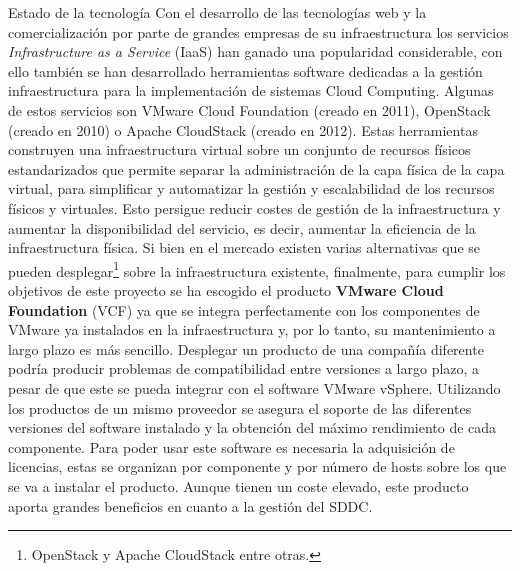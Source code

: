 \begin{section}{Estado de la tecnología}
Con el desarrollo de las tecnologías web y la comercialización por parte de grandes empresas de su infraestructura los servicios \textit{Infrastructure as a Service} (IaaS) han ganado una popularidad considerable, con ello también se han desarrollado herramientas software dedicadas a la gestión infraestructura para la implementación de sistemas Cloud Computing. Algunas de estos servicios son VMware Cloud Foundation (creado en 2011), OpenStack (creado en 2010) o Apache CloudStack (creado en 2012). Estas herramientas construyen una infraestructura virtual sobre un conjunto de recursos físicos estandarizados que permite separar la administración de la capa física de la capa virtual, para simplificar y automatizar la gestión y escalabilidad de los recursos físicos y virtuales. Esto persigue reducir costes de gestión de la infraestructura y aumentar la disponibilidad del servicio, es decir, aumentar la eficiencia de la infraestructura física.
Si bien en el mercado existen varias alternativas que se pueden desplegar\footnote{OpenStack y Apache CloudStack entre otras.} sobre la infraestructura existente, finalmente, para cumplir los objetivos de este proyecto se ha escogido el producto \textbf{VMware Cloud Foundation} (VCF) ya que se integra perfectamente con los componentes de VMware ya instalados en la infraestructura y, por lo tanto, su mantenimiento a largo plazo es más sencillo. Desplegar un producto de una compañía diferente podría producir problemas de compatibilidad entre versiones a largo plazo, a pesar de que este se pueda integrar con el software VMware vSphere. Utilizando los productos de un mismo proveedor se asegura el soporte de las diferentes versiones del software instalado y la obtención del máximo rendimiento de cada componente.
Para poder usar este software es necesaria la adquisición de licencias, estas se organizan por componente y por número de hosts sobre los que se va a instalar el producto. Aunque tienen un coste elevado, este producto aporta grandes beneficios en cuanto a la gestión del SDDC.


\end{section}
